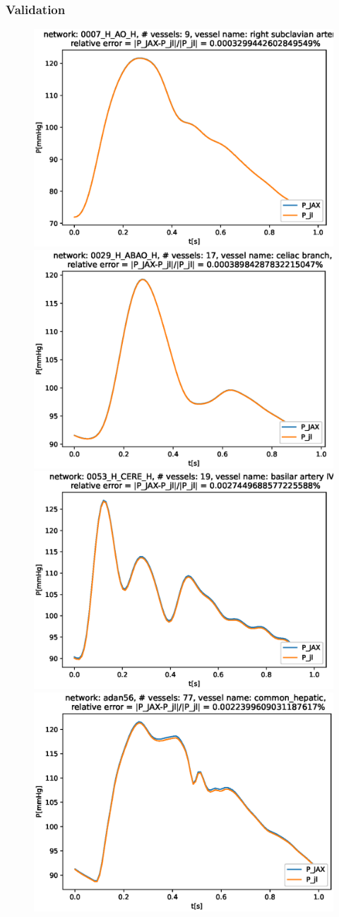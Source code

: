 \documentclass{beamer}
\begin{document}
\begin{frame}
	\frametitle{Validation}
	\begin{figure} [H]
		\centering
		\includegraphics[width=0.46\columnwidth]{images/0007_H_AO_H_right_subclavian_artery_P.eps}
		\includegraphics[width=0.46\columnwidth]{images/0029_H_ABAO_H_celiac_branch_P.eps
		}
		\includegraphics[width=0.46\columnwidth]{images/0053_H_CERE_H_basilar_artery_IV_P.eps}
		\includegraphics[width=0.46\columnwidth]{images/adan56_common_hepatic_P.eps}
		\label{fig:val}
	\end{figure}
\end{frame}
\end{document}

